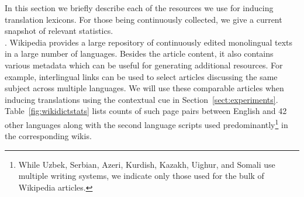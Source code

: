 \documentclass{article}
\newcommand{\secref}[1]{Section~\ref{#1}}
\newcommand{\tabref}[1]{Table~\ref{#1}}
\begin{document}
In this section we briefly describe each of the resources we use for inducing translation lexicons.  For those being continuously collected, we give a current snapshot of relevant statistics.\\

. Wikipedia provides a large repository of continuously edited monolingual texts in a large number of languages.  Besides the article content, it also contains various metadata which can be useful for generating additional resources.  For example,
interlingual links can be used to select articles discussing the same subject across multiple languages.  We will use these comparable articles when inducing translations using the contextual cue in \secref{sect:experiments}.  \tabref{fig:wikidictstats} lists counts of such page pairs between English and 42 other languages along with the second language scripts used predominantly\footnote{While Uzbek, Serbian, Azeri, Kurdish, Kazakh, Uighur, and Somali use multiple writing systems, we indicate only those used for the bulk of Wikipedia articles.} in the corresponding wikis.\\
 
\end{document}

